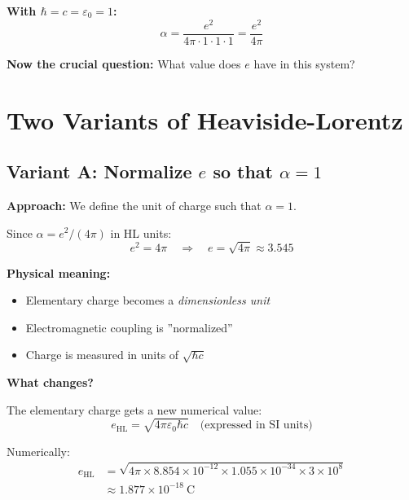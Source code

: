 	\textbf{With $\hbar = c = \varepsilon_0 = 1$:}
	\begin{equation}
		\alpha = \frac{e^2}{4\pi \cdot 1 \cdot 1 \cdot 1} = \frac{e^2}{4\pi}
	\end{equation}
	
	\textbf{Now the crucial question:} What value does $e$ have in this system?
	
	\section[Two Variants of Heaviside-Lorentz]{Two Variants of Heaviside-Lorentz}
	
	\subsection[Variant A]{Variant A: Normalize $e$ so that $\alpha = 1$}
	
	\textbf{Approach:} We define the unit of charge such that $\alpha = 1$.
	
	Since $\alpha = e^2/(4\pi)$ in HL units:
	\begin{equation}
		e^2 = 4\pi \quad \Rightarrow \quad e = \sqrt{4\pi} \approx 3.545
	\end{equation}
	
	\textbf{Physical meaning:}
	\begin{itemize}
		\item Elementary charge becomes a \textit{dimensionless unit}
		\item Electromagnetic coupling is ''normalized''
		\item Charge is measured in units of $\sqrt{\hbar c}$
	\end{itemize}
	
	\textbf{What changes?}
	
	The elementary charge gets a new numerical value:
	\begin{equation}
		e_{\text{HL}} = \sqrt{4\pi\varepsilon_0\hbar c} \quad \text{(expressed in SI units)}
	\end{equation}
	
	Numerically:
	\begin{align}
		e_{\text{HL}} &= \sqrt{4\pi \times 8.854 \times 10^{-12} \times 1.055 \times 10^{-34} \times 3 \times 10^8} \\
		&\approx 1.877 \times 10^{-18}\ \text{C}
	\end{align}
	
